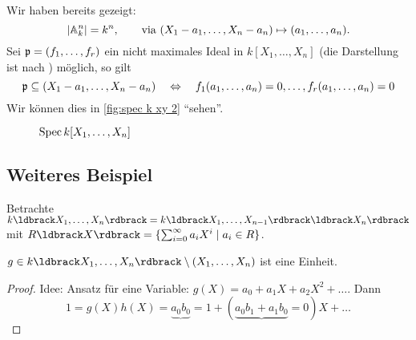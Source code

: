 Wir haben bereits gezeigt:
\[
	|\mathbb{A}_k^n| = k^n, \qquad\text{via } 
		(X_1-a_1,\ldots,X_n-a_n) \mapsto (a_1,\ldots,a_n).
\]
Sei $\mathfrak{p} = (f_1, \ldots, f_r)$ ein nicht maximales Ideal in $k[X_1,\ldots,X_n]$
(die Darstellung ist nach ) möglich,
so gilt
\[
	\mathfrak{p} \subseteq (X_1 - a_1, \ldots, X_n - a_n)
	\quad\Leftrightarrow\quad
	f_1(a_1,\ldots,a_n) = 0, \ldots,
	f_r(a_1,\ldots,a_n) = 0
\]
Wir können dies in \autoref{fig:spec k xy 2} "`sehen"'.

\begin{figure}\centering
	\caption{$\operatorname{Spec} k[X_1,\ldots,X_n]$}
	\label{fig:spec k xy 2}
\end{figure}

\subsection{Weiteres Beispiel}
Betrachte $k\ldbrack X_1, \ldots, X_n\rdbrack = 
	k\ldbrack X_1,\ldots,X_{n-1}\rdbrack\ldbrack X_n\rdbrack$
mit $R\ldbrack X\rdbrack = \{\sum_{i=0}^\infty a_i X^i \mid a_i \in R\}$.

\begin{bemerkung}
	$g \in k\ldbrack X_1, \ldots, X_n\rdbrack \setminus (X_1,\ldots,X_n)$
	ist eine Einheit.
\end{bemerkung}
\begin{proof}
	Idee: Ansatz für eine Variable:
	$g(X) = a_0 + a_1X + a_2X^2+ \ldots$. Dann
	\[
		1 = g(X)h(X) = 
		\underbrace{a_0 b_0}{= 1} + 
		(\underbrace{a_0b_1+a_1b_0}{= 0})X + \ldots
	\] 
\end{proof}

